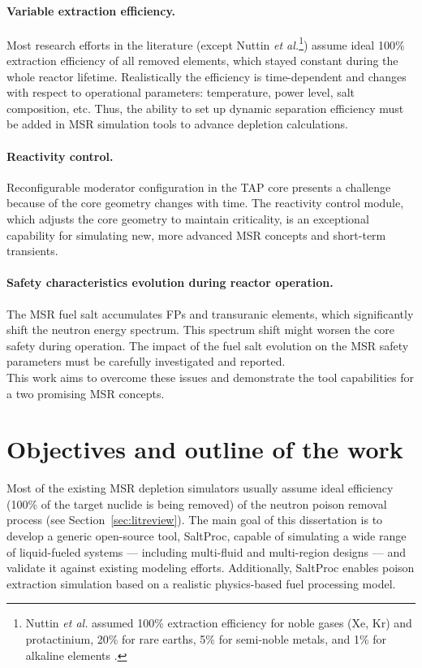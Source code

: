\paragraph*{Variable extraction efficiency.} Most research efforts in 
the literature (except Nuttin \emph{et al.}\footnote{Nuttin \emph{et al.} 
assumed 100\% extraction efficiency for noble gases (Xe, Kr) and protactinium, 
20\% for rare earths, 5\% for semi-noble metals, and 1\% for alkaline 
elements \cite{nuttin_potential_2005}.}) assume ideal 100\% extraction 
efficiency of all removed 
elements, which stayed constant during the whole reactor lifetime. 
Realistically the efficiency is time-dependent and changes with respect to 
operational parameters: temperature, power level, salt composition, etc. Thus, 
the ability to set up dynamic separation efficiency must be added in \gls{MSR} 
simulation tools to advance depletion calculations.
\paragraph*{Reactivity control.} Reconfigurable moderator configuration in the 
\gls{TAP} core presents a challenge because of the core geometry changes with 
time. The reactivity control module, which adjusts the core geometry 
to maintain criticality, is an exceptional capability for simulating  
new, more advanced \gls{MSR} concepts and short-term transients.
\paragraph*{Safety characteristics evolution during reactor operation.} The 
\gls{MSR} fuel salt  accumulates \glspl{FP} and transuranic elements, which 
significantly shift the neutron energy spectrum. This spectrum shift might 
worsen the core safety during operation. The impact of the fuel salt 
evolution on the \gls{MSR} safety parameters must be carefully investigated 
and reported.\\

This work aims to overcome these issues and demonstrate the tool capabilities 
for a two promising \gls{MSR} concepts.


\section{Objectives and outline of the work}
Most of the existing \gls{MSR} depletion simulators usually assume ideal  
efficiency (100\% of the target nuclide is being removed) of the neutron 
poison removal process (see Section~\ref{sec:litreview}). The main goal of 
this dissertation is to develop a generic open-source tool, SaltProc, capable 
of simulating a wide range of liquid-fueled systems --- including multi-fluid 
and multi-region designs --- and validate it against existing modeling 
efforts. Additionally, SaltProc enables poison extraction simulation based on 
a realistic physics-based fuel processing model. 


